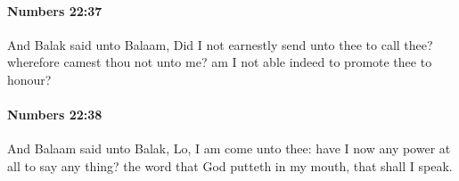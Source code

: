 		\paragraph{Numbers 22:37} %
			\label{NUMBERS-22-37}

			And Balak said unto Balaam, Did I not earnestly send unto thee to call thee? wherefore camest thou not unto me? am I not able indeed to promote thee to honour?


		\paragraph{Numbers 22:38} %
			\label{NUMBERS-22-38}

			And Balaam said unto Balak, Lo, I am come unto thee: have I now any power at all to say any thing? the word that God putteth in my mouth, that shall I speak.


